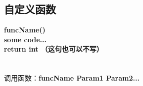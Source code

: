 \documentclass[11pt]{article}
\begin{document}
\subsection{自定义函数}
\textbf{
    funcName()\textbraceleft \\
        some code... \\
        return int \quad （这句也可以不写）\\
    \textbraceright  \\
} \\
调用函数：\textbf{funcName Param1 Param2...}















    
\end{document}
